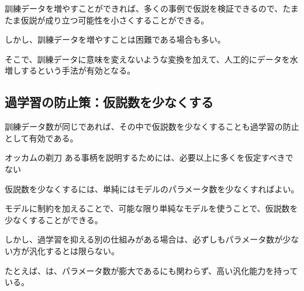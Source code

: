 \documentclass[../../../topic_machine-learning]{subfiles}
\begin{document}
訓練データを増やすことができれば、多くの事例で仮説を検証できるので、たまたま仮説が成り立つ可能性を小さくすることができる。

\br

しかし、訓練データを増やすことは困難である場合も多い。

そこで、訓練データに意味を変えないような変換を加えて、人工的にデータを水増しするという手法が有効となる。

\subsection{過学習の防止策：仮説数を少なくする}

訓練データ数が同じであれば、その中で仮説数を少なくすることも過学習の防止として有効である。

\begin{theorem}{オッカムの剃刀}
  ある事柄を説明するためには、必要以上に多くを仮定すべきでない
\end{theorem}

仮説数を少なくするには、単純にはモデルのパラメータ数を少なくすればよい。

モデルに制約を加えることで、可能な限り単純なモデルを使うことで、仮説数を少なくすることができる。

\br

しかし、過学習を抑える別の仕組みがある場合は、必ずしもパラメータ数が少ない方が汎化するとは限らない。

たとえば、は、パラメータ数が膨大であるにも関わらず、高い汎化能力を持っている。
\end{document}
